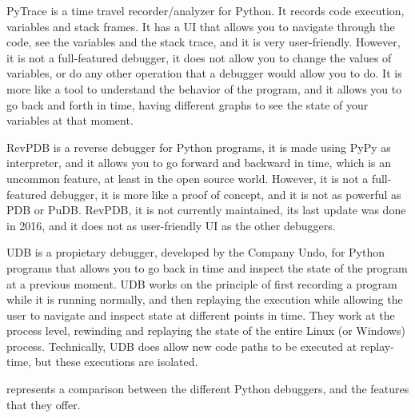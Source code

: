 PyTrace\cite{pytrace} is a time travel recorder/analyzer for Python. It records code execution, 
variables and stack frames. It has a UI that allows you to navigate through the code, 
see the variables and the stack trace, and it is very user-friendly. However, it is not 
a full-featured debugger, it does not allow you to change the values of variables, or do 
any other operation that a debugger would allow you to do. It is more like a tool to 
understand the behavior of the program, and it allows you to go back and forth in time, 
having different graphs to see the state of your variables at that moment.

\ac{RevPDB}\cite{revdeb} is a reverse debugger for Python programs, it is made using PyPy as interpreter,
and it allows you to go forward and backward in time, which is an uncommon feature, at least 
in the open source world. However, it is not a full-featured debugger, it is more like a 
proof of concept, and it is not as powerful as \ac{PDB} or PuDB. \ac{RevPDB}, it is not 
currently maintained, its last update was done in 2016, and it does not as 
user-friendly UI as the other debuggers.

\ac{UDB}\cite{udb} is a propietary debugger, developed by the Company 
Undo, for Python programs that allows you to go back in time 
and inspect the state of the program at a previous moment. \ac{UDB} works on the principle of first recording 
a program while it is running normally, and then replaying the execution while allowing the 
user to navigate and inspect state at different points in time. They work at the process 
level, rewinding and replaying the state of the entire Linux (or Windows) process. Technically, 
\ac{UDB} does allow new code paths to be executed at replay-time, but these executions are 
isolated.

 represents a comparison between the different Python debuggers, 
and the features that they offer. 


